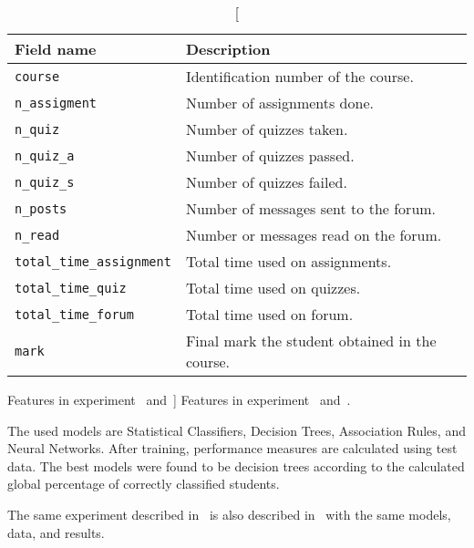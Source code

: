\begin{table}[h!]
    \centering

    \begin{tabular}{l l}
        Field name                       & Description                                    \\ \hline
        \texttt{course}                  & Identification number of the course.           \\
        \texttt{n\_assigment}            & Number of assignments done.                    \\
        \texttt{n\_quiz}                 & Number of quizzes taken.                       \\
        \texttt{n\_quiz\_a}              & Number of quizzes passed.                      \\
        \texttt{n\_quiz\_s}              & Number of quizzes failed.                      \\
        \texttt{n\_posts}                & Number of messages sent to the forum.          \\
        \texttt{n\_read}                 & Number or messages read on the forum.          \\
        \texttt{total\_time\_assignment} & Total time used on assignments.                \\
        \texttt{total\_time\_quiz}       & Total time used on quizzes.                    \\
        \texttt{total\_time\_forum}      & Total time used on forum.                      \\
        \texttt{mark}                    & Final mark the student obtained in the course. \\
    \end{tabular}

    \caption
        [Features in experiment~\cite{ind_001} and~\cite{ind_004}]
        {Features in experiment~\cite{ind_001} and~\cite{ind_004}.}

    \label{tab:ind_001_004_fields}
\end{table}

The used models are Statistical Classifiers, Decision Trees, Association Rules,
and Neural Networks. After training, performance measures are calculated using
test data. The best models were found to be decision trees according to the
calculated global percentage of correctly classified students.

The same experiment described in~\cite{ind_001} is also described
in~\cite{ind_004} with the same models, data, and results.

